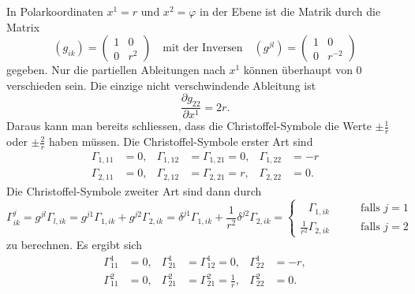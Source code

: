 \begin{beispiel}
\label{buch:zusammenhang:paralleltransport:bsp:polar}
In Polarkoordinaten $x^1=r$ und $x^2=\varphi$ in der Ebene ist die
Matrik durch die Matrix
\[
(g_{ik})
=
\begin{pmatrix}
1&0\\
0&r^2
\end{pmatrix}
\quad
\text{mit der Inversen}
\quad
(g^{jl})
=
\begin{pmatrix}
1&0\\
0&r^{-2}
\end{pmatrix}
\]
gegeben.
Nur die partiellen Ableitungen nach $x^1$ können überhaupt von $0$
verschieden sein.
Die einzige nicht verschwindende Ableitung ist
\[
\frac{\partial g_{22}}{\partial x^1}
=
2r.
\]
Daraus kann man bereits schliessen, dass die Christoffel-Symbole die Werte
$\pm\frac1r$ oder $\pm\frac2r$ haben müssen.
Die Christoffel-Symbole erster Art sind
\[
\begin{aligned}
\Gamma_{1,11} &= 0,
&
\Gamma_{1,12} &= \Gamma_{1,21} = 0,
&
\Gamma_{1,22} &= -r
\\
\Gamma_{2,11} &= 0,
&
\Gamma_{2,12} &= \Gamma_{2,21} = r,
&
\Gamma_{2,22} &= 0.
\end{aligned}
\]
Die Christoffel-Symbole zweiter Art sind dann durch
\[
\Gamma^j_{ik}
=
g^{jl}\Gamma_{l,ik}
=
g^{j1}\Gamma_{1,ik}
+
g^{j2}\Gamma_{2,ik}
=
\delta^{j1}\Gamma_{1,ik}
+
\frac{1}{r^2}
\delta^{j2}\Gamma_{2,ik}
=
\begin{cases}
\phantom{\frac1{r^2}}\Gamma_{1,ik}&\qquad\text{falls $j=1$}\\
         \frac1{r^2} \Gamma_{2,ik}&\qquad\text{falls $j=2$}
\end{cases}
\]
zu berechnen.
Es ergibt sich
\[
\begin{aligned}
\Gamma^1_{11} &= 0,
&
\Gamma^1_{21} &= \Gamma^1_{12} = 0,
&
\Gamma^1_{22} &= -r,
\\
\Gamma^2_{11} &= 0,
&
\Gamma^2_{21} &= \Gamma^2_{21} = \frac1r,
&
\Gamma^2_{22} &= 0.
\end{aligned}
\]
\end{beispiel}

